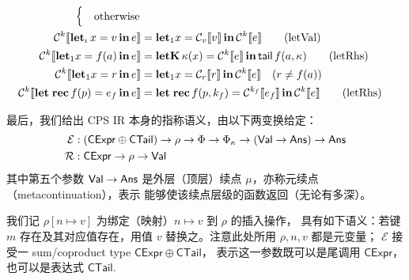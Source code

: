 \documentclass[a4paper, 11pt]{article}
\theoremstyle{remark}\newtheorem*{remark}{Remark}
\theoremstyle{definition}\newtheorem*{definition}{Definition}
\begin{document}
\begin{align*}
\begin{cases}
    & \text{otherwise}
  \end{cases}\\
  \mathcal{C}^k\llbracket \mathbf{let}_\iota\, x = v\, \mathbf{in}\, e \rrbracket &=
  \mathbf{let}_1 x = \mathcal{C}_v\llbracket v \rrbracket\, \mathbf{in}\, \mathcal{C}^k\llbracket e \rrbracket \tag{letVal} \\
  \mathcal{C}^k\llbracket \mathbf{let}_1 x = f(a)\, \mathbf{in}\, e \rrbracket &=
  \mathbf{letK}\, \kappa(x) = \mathcal{C}^k\llbracket e \rrbracket\, \mathbf{in}\, \mathsf{tail}\, f(a, \kappa) \tag{letRhs} \\
  \mathcal{C}^k\llbracket \mathbf{let}_1 x = r\, \mathbf{in}\, e \rrbracket &=
  \mathbf{let}_1 x = \mathcal{C}_r\llbracket r \rrbracket\, \mathbf{in}\, \mathcal{C}^k\llbracket e \rrbracket
  \quad (r \neq f(a)) \\
  \mathcal{C}^k\llbracket \mathbf{let\;rec}\, f(p) = e_f\, \mathbf{in}\, e \rrbracket &=
  \mathbf{let\;rec}\, f(p, k_f) = \mathcal{C}^{k_f}\llbracket e_f \rrbracket\, \mathbf{in}\, \mathcal{C}^k\llbracket e \rrbracket \tag{letRhs} \\
\end{align*}
\endgroup

最后，我们给出 CPS IR 本身的指称语义，由以下两变换给定：
\begin{align*}
  \mathcal{E} &: (\mathsf{CExpr}\oplus\mathsf{CTail}) \to \rho \to \Phi \to \Phi_\kappa \to (\mathsf{Val} \to \mathsf{Ans}) \to \mathsf{Ans}\\
  \mathcal{R} &: \mathsf{CExpr}\to\rho\to\mathsf{Val}
\end{align*}
其中第五个参数 $\mathsf{Val}\to\mathsf{Ans}$ 是外层（顶层）续点 $\mu$，亦称元续点（metacontinuation），表示
能够使该续点层级的函数返回（无论有多深）。

我们记 $\rho[n\mapsto v]$ 为绑定（映射）$n\mapsto v$ 到 $\rho$ 的插入操作，
具有如下语义：若键 $m$ 存在及其对应值存在，用值 $v$ 替换之。注意此处所用 $\rho,n,v$ 都是元变量；
$\mathcal{E}$ 接受一 sum/coproduct type $\mathsf{CExpr}\oplus\mathsf{CTail}$，
表示这一参数既可以是尾调用 $\mathsf{CExpr}$，也可以是表达式 $\mathsf{CTail}$.
\end{document}
